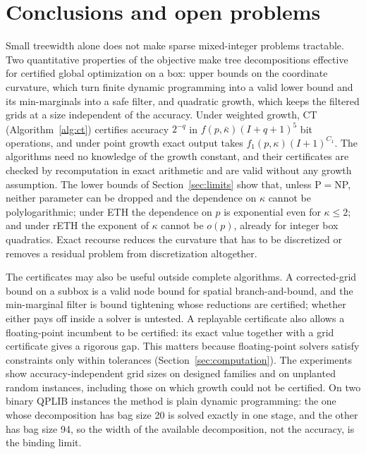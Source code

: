 \section{Conclusions and open problems}\label{sec:conclusion}

Small treewidth alone does not make sparse mixed-integer problems
tractable. Two quantitative properties of the objective make tree
decompositions effective for certified global optimization on a box: upper
bounds on the coordinate curvature, which turn finite dynamic programming into
a valid lower bound and its min-marginals into a safe filter, and quadratic
growth, which keeps the filtered grids at a size independent of the accuracy.
Under weighted growth, CT (Algorithm~\ref{alg:ct}) certifies accuracy
$2^{-q}$ in $f(p,\bar\kappa)(I+q+1)^5$ bit operations, and under point growth
exact output takes $f_1(p,\kappa)(I+1)^{C_1}$. The algorithms need no knowledge of
the growth constant, and their certificates are checked by recomputation in
exact arithmetic and are valid without any growth assumption. The lower bounds of
Section~\ref{sec:limits} show that, unless P${}={}$NP, neither parameter can
be dropped and the dependence on $\kappa$ cannot be polylogarithmic; under
ETH the dependence on $p$ is exponential even for $\kappa\le2$; and under
rETH the exponent of $\kappa$ cannot be $o(p)$, already for integer box
quadratics. Exact recourse reduces the curvature that has to be discretized
or removes a residual problem from discretization altogether.

The certificates may also be useful outside complete algorithms. A
corrected-grid bound on a subbox is a valid node bound for spatial
branch-and-bound, and the min-marginal filter is bound tightening whose
reductions are certified; whether either pays off inside a solver is
untested. A replayable certificate also allows a floating-point incumbent to
be certified: its exact value together with a grid certificate gives a
rigorous gap. This matters because floating-point solvers satisfy constraints
only within tolerances (Section~\ref{sec:computation}). The experiments show
accuracy-independent grid sizes on designed families and on unplanted random
instances, including those on which growth could not be certified. On two
binary QPLIB instances the method is plain dynamic programming: the one whose
decomposition has bag size 20 is solved exactly in one stage, and the other
has bag size 94, so the width of the available decomposition, not the
accuracy, is the binding limit.

